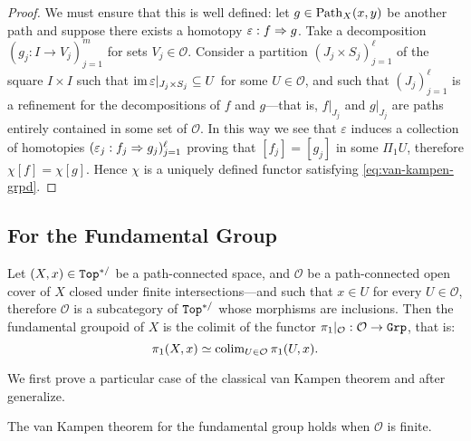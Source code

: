 \begin{proof}
We must ensure that this is well defined: let \(g \in \operatorname{Path}_X(x, y)\) be another
path and suppose there exists a homotopy \(\varepsilon: f \Rightarrow g\). Take a
decomposition \((g_j: I \to V_j)_{j=1}^m\) for sets \(V_j \in
\mathcal{O}\). Consider a partition \((J_j \times S_j)_{j=1}^{\ell}\) of the
square \(I \times I\) such that
\(\operatorname{im} \varepsilon|_{J_j \times S_j} \subseteq U\) for some
\(U \in \mathcal{O}\), and such that \((J_j)_{j=1}^{\ell}\) is a refinement for
the decompositions of \(f\) and \(g\)---that is, \(f|_{J_j}\) and \(g|_{J_j}\)
are paths entirely contained in some set of \(\mathcal{O}\). In this way we see
that \(\varepsilon\) induces a collection of homotopies
\((\varepsilon_j: f_j \Rightarrow g_j)_{j=1}^{\ell}\) proving that \([f_j] = [g_j]\) in
some \(\Pi_1 U\), therefore \(\chi [f] = \chi [g]\). Hence \(\chi\) is a
uniquely defined functor satisfying \cref{eq:van-kampen-grpd}.
\end{proof}

\subsection{For the Fundamental Group}

\begin{theorem}
\label{thm:van-kampen-group}
Let \((X, x) \in {\texttt{Top}^{*/}}\) be a path-connected space, and \(\mathcal{O}\) be a
path-connected open cover of \(X\) closed under finite intersections---and such
that \(x \in U\) for every \(U \in \mathcal{O}\), therefore \(\mathcal{O}\) is a
subcategory of \({\texttt{Top}^{*/}}\) whose morphisms are inclusions. Then the fundamental
groupoid of \(X\) is the colimit of the functor \(\pi_1|_{\mathcal{O}}:
\mathcal{O} \to {\texttt{Grp}}\), that is:
\[
\pi_1(X, x) \simeq \operatorname{colim}_{U \in \mathcal{O}} \pi_1(U, x).
\]
\end{theorem}

We first prove a particular case of the classical van Kampen theorem and after
generalize.

\begin{lemma}
\label{lem:van-kampen-finite-cover}
The van Kampen theorem for the fundamental group holds when \(\mathcal{O}\) is
finite.
\end{lemma}

